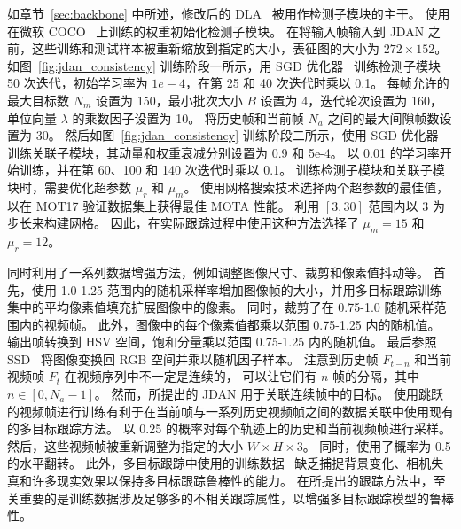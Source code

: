 如章节~\ref{sec:backbone} 中所述，修改后的 DLA~\cite{point} 被用作检测子模块的主干。
使用在微软 COCO~\cite{lin2014microsoft} 上训练的权重初始化检测子模块。
在将输入帧输入到 JDAN 之前，这些训练和测试样本被重新缩放到指定的大小，表征图的大小为 $272 \times 152$。
如图~\ref{fig:jdan_consistency} 训练阶段一所示，用 SGD 优化器~\cite{sgd} 训练检测子模块 50 次迭代，初始学习率为 $1e-4$，在第 25 和 40 次迭代时乘以 0.1。
%
每帧允许的最大目标数 $N_m$ 设置为 150，最小批次大小 $B$ 设置为 4，迭代轮次设置为 160，单位向量 $\lambda$ 的乘数因子设置为 10。
将历史帧和当前帧 $N_a$ 之间的最大间隙帧数设置为 30。
然后如图~\ref{fig:jdan_consistency} 训练阶段二所示，使用 SGD 优化器~\cite{sgd} 训练关联子模块，其动量和权重衰减分别设置为 0.9 和 5e-4。
以 0.01 的学习率开始训练，并在第 60、100 和 140 次迭代时乘以 0.1。
训练检测子模块和关联子模块时，需要优化超参数 $\mu_r$ 和 $\mu_m$。
使用网格搜索技术选择两个超参数的最佳值，以在 MOT17 验证数据集上获得最佳 MOTA 性能。
利用 $[3, 30]$ 范围内以 3 为步长来构建网格。
因此，在实际跟踪过程中使用这种方法选择了 $\mu_m=15$ 和 $\mu_r=12$。


\label{sec:PP}
同时利用了一系列数据增强方法，例如调整图像尺寸、裁剪和像素值抖动等。
首先，使用 1.0-1.25 范围内的随机采样率增加图像帧的大小，并用多目标跟踪训练集中的平均像素值填充扩展图像中的像素。
同时，裁剪了在 0.75-1.0 随机采样范围内的视频帧。
此外，图像中的每个像素值都乘以范围 0.75-1.25 内的随机值。
输出帧转换到 HSV 空间，饱和分量乘以范围 0.75-1.25 内的随机值。
最后参照 SSD~\cite{Liu2016} 将图像变换回 RGB 空间并乘以随机因子样本。
%
注意到历史帧 $F_{t-n}$ 和当前视频帧 $F_t$ 在视频序列中不一定是连续的，
可以让它们有 $n$ 帧的分隔，其中 $n \in [0, N_a-1] $。
然而，所提出的 JDAN 用于关联连续帧中的目标。
使用跳跃的视频帧进行训练有利于在当前帧与一系列历史视频帧之间的数据关联中使用现有的多目标跟踪方法。
以 0.25 的概率对每个轨迹上的历史和当前视频帧进行采样。
然后，这些视频帧被重新调整为指定的大小 $W \times H \times 3$。
同时，使用了概率为 0.5 的水平翻转。
此外，多目标跟踪中使用的训练数据~\cite{mot16,Lyu2017} 缺乏捕捉背景变化、相机失真和许多现实效果以保持多目标跟踪鲁棒性的能力。
在所提出的跟踪方法中，至关重要的是训练数据涉及足够多的不相关跟踪属性，以增强多目标跟踪模型的鲁棒性。
%




